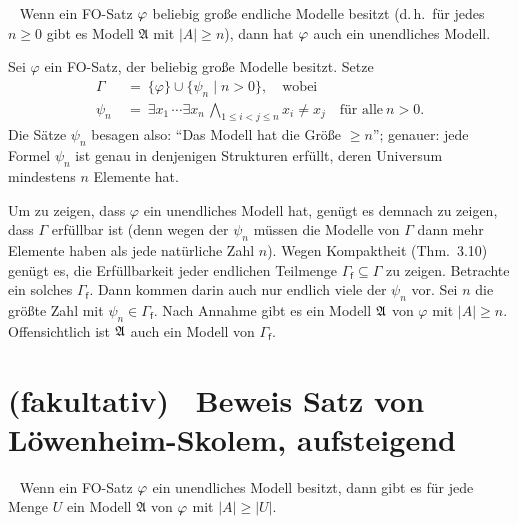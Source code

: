 \documentclass[fontsize=11pt, twoside=false, numbers=autoenddot]{scrbook}
\begin{document}
~
Wenn ein FO-Satz $\varphi$ beliebig große endliche Modelle besitzt
(d.\,h.\ f\"ur jedes $n \geq 0$ gibt es Modell $\mathfrak{A}$ mit $|A|\geq n$),
dann hat $\varphi$ auch ein unendliches Modell.
%
\begin{beweis}
  Sei $\varphi$ ein FO-Satz, der beliebig große Modelle besitzt.
  Setze
  \begin{align*}
    \Gamma & ~=~ \{\varphi\} \cup \{\psi_n \mid n > 0\},\quad \text{wobei} \\
    \psi_n & ~=~ \exists x_1\, \cdots \exists x_n\, \bigwedge_{1 \leq i < j \leq n} x_i \neq x_j\quad \text{für alle}~ n > 0.
  \end{align*}
  Die Sätze $\psi_n$ besagen also: "`Das Modell hat die Größe $\geq n$"';
  genauer: jede Formel $\psi_n$ 
  ist genau in denjenigen Strukturen erfüllt,
  deren Universum mindestens $n$ Elemente hat.

  Um zu zeigen, dass $\varphi$ ein unendliches Modell hat,
  genügt es demnach zu zeigen, dass $\Gamma$ erfüllbar ist
  (denn wegen der $\psi_n$ müssen die Modelle von $\Gamma$ dann
  mehr Elemente haben als jede natürliche Zahl $n$).
  Wegen Kompaktheit (Thm.~3.10) genügt es,
  die Erfüllbarkeit jeder endlichen Teilmenge $\Gamma_{\textsf{f}} \subseteq \Gamma$
  zu zeigen.
  Betrachte ein solches $\Gamma_{\textsf{f}}$.
  Dann kommen darin auch nur endlich viele der $\psi_n$ vor.
  Sei $n$ die größte Zahl mit $\psi_n \in \Gamma_{\textsf{f}}$.
  Nach Annahme gibt es ein Modell $\mathfrak{A}$ von $\varphi$
  mit $|A| \geq n$.
  Offensichtlich ist $\mathfrak{A}$ auch ein Modell von $\Gamma_{\textsf{f}}$.
  \qedhere
\end{beweis}%

\section*{(fakultativ)~ Beweis Satz von Löwenheim-Skolem, aufsteigend}

~
Wenn ein FO-Satz $\varphi$ ein unendliches Modell besitzt,
dann gibt es f\"ur jede Menge $U$ ein Modell $\mathfrak{A}$ von $\varphi$ mit $|A| \geq |U|$.
\end{document}
